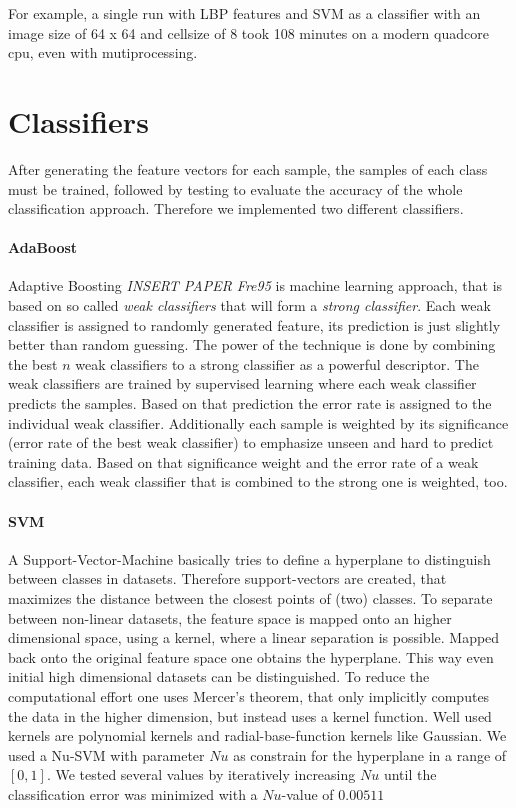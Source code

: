 \documentclass[a4paper,10pt]{article}
\begin{document}
For example, a single run with LBP features and SVM as a classifier with an image size of 64 x 64 and cellsize of 8 took 108 minutes on a modern quadcore cpu, even with mutiprocessing.
\section{Classifiers}

After generating the feature vectors for each sample, the samples of each class must be trained, followed by testing to evaluate the accuracy of the whole classification approach. 
Therefore we implemented two different classifiers. 

\paragraph{AdaBoost}
Adaptive Boosting \emph{INSERT PAPER Fre95} is machine learning approach, that is based on so called \textit{weak classifiers} that will form a \textit{strong classifier}. Each weak classifier is assigned to randomly generated feature, its prediction is just slightly better than random guessing. The power of the technique is done by combining the best $n$ weak classifiers to a strong classifier as a powerful descriptor. The weak classifiers are trained by supervised learning where each weak classifier predicts the samples. Based on that prediction the error rate is assigned to the individual weak classifier. Additionally each sample is weighted by its significance (error rate of the best weak classifier) to emphasize unseen and hard to predict training data. Based on that significance weight and the error rate of a weak classifier, each weak classifier that is combined to the strong one is weighted, too.
\paragraph{SVM}
A Support-Vector-Machine basically tries to define a hyperplane to distinguish between classes in datasets. Therefore support-vectors are created, that maximizes the distance between the closest points of (two) classes. To separate between non-linear datasets, the feature space is mapped onto an higher dimensional space, using a kernel, where a linear separation is possible. Mapped back onto the original feature space one obtains the hyperplane. This way even initial high dimensional datasets can be distinguished. To reduce the computational effort one uses Mercer's theorem, that only implicitly computes the data in the higher dimension, but instead uses a kernel function. Well used kernels are polynomial kernels and radial-base-function kernels like Gaussian. We used a Nu-SVM with parameter $Nu$ as constrain for the hyperplane in a range of $[0,1]$. We tested several values by iteratively increasing $Nu$ until the classification error was minimized with a $Nu$-value of $0.00511$ 
\end{document}
